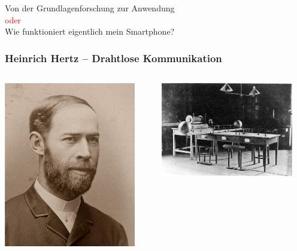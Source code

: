\documentclass[14pt]{beamer}
\begin{document}
\begin{frame}
	\centering
	\large{Von der Grundlagenforschung zur Anwendung}\\
	\small{\textcolor{red}{oder}}\\
	\large{Wie funktioniert eigentlich mein Smartphone?}
\end{frame}

\begin{frame}
	\frametitle{Heinrich Hertz -- Drahtlose Kommunikation}
	\begin{center}
		\begin{columns}
			\begin{column}{0.5\textwidth}
		\includegraphics[width=0.9\textwidth]{heinrich_hertz.jpg}
			\end{column}
			\begin{column}{0.5\textwidth}
		\includegraphics[width=0.9\textwidth]{heinrich_hertz_setup.jpg}
			\end{column}
		\end{columns}
	\end{center}
\end{frame}
\end{document}
